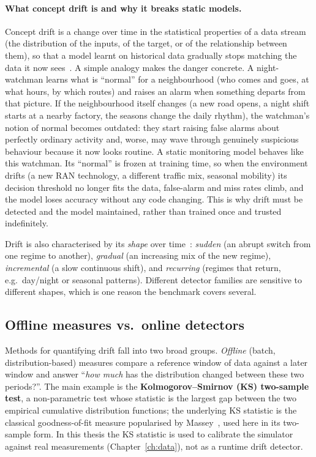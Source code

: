 \paragraph{What concept drift is and why it breaks static models.}
Concept drift is a change over time in the statistical properties of a data
stream (the distribution of the inputs, of the target, or of the relationship
between them), so that a model learnt on historical data gradually stops
matching the data it now sees~\cite{gama2014survey,lu2018drift}. A simple
analogy makes the danger concrete. A night-watchman learns what is ``normal''
for a neighbourhood (who comes and goes, at what hours, by which routes) and
raises an alarm when something departs from that picture. If the neighbourhood
itself changes (a new road opens, a night shift starts at a nearby factory, the
seasons change the daily rhythm), the watchman's notion of normal becomes
outdated: they start raising false alarms about perfectly ordinary activity and,
worse, may wave through genuinely suspicious behaviour because it now looks
routine. A static monitoring model behaves like this watchman. Its ``normal'' is frozen
at training time, so when the environment drifts (a new RAN technology, a
different traffic mix, seasonal mobility) its decision threshold no longer fits
the data, false-alarm and miss rates climb, and the model loses accuracy without
any code changing. This is why drift must
be detected and the model maintained, rather than trained once and trusted
indefinitely.

Drift is also characterised by its \emph{shape} over
time~\cite{gama2014survey}: \emph{sudden} (an abrupt switch from one regime to
another), \emph{gradual} (an increasing mix of the new regime), \emph{incremental}
(a slow continuous shift), and \emph{recurring} (regimes that return, e.g.\
day/night or seasonal patterns). Different detector families are sensitive to
different shapes, which is one reason the benchmark covers several.

\subsection{Offline measures vs.\ online detectors}
\label{subsec:drift-methods}

Methods for quantifying drift fall into two broad groups. \emph{Offline}
(batch, distribution-based) measures compare a reference window of data against a
later window and answer ``\emph{how much} has the distribution changed between
these two periods?''. The main example is the \textbf{Kolmogorov--Smirnov (KS)
two-sample test}, a non-parametric test whose statistic is the largest gap
between the two empirical cumulative distribution functions; the underlying KS
statistic is the classical goodness-of-fit measure popularised by
Massey~\cite{massey1951ks}, used here in its two-sample form.
In this thesis the KS statistic is used to calibrate the simulator against real
measurements (Chapter~\ref{ch:data}), not as a runtime drift detector.

